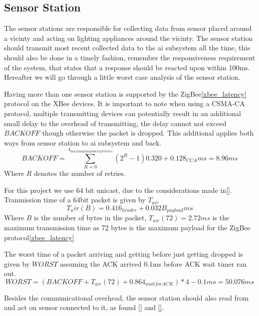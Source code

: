 \subsection{Sensor Station}\label{sub:sensorStation}

The sensor stations are responsible for collecting data from sensor placed around a vicinty and acting on lighting appliances around the vicinty. The sensor station should transmit most recent collected data to the ai subsystem all the time, this should also be done in a timely fashion, remember the responsiveness requirement of the system, that states that a response should be reacted upon within 100ms. Hereafter we will go through a little worst case analysis of the sensor station.

Having more than one sensor station is supported by the ZigBee\cref{xbee_latency} protocol on the XBee devices. It is important to note when using a CSMA-CA protocol, multiple transmitting devices can potentially result in an additional small delay to the overhead of transmitting, the delay cannot not exceed $BACKOFF$ though otherwise the packet is dropped. This additional applies both ways from sensor station to ai subsystem and back.
\begin{equation*}
BACKOFF = \sum\limits_{R=0}^{4_{maximum number of retries}}(2^{R} - 1) 0.320 + 0.128_{CCA} ms = 8.96 ms
\end{equation*}
Where $R$ denotes the number of retries.

For this project we use 64 bit unicast, due to the considerations made in\cref{}.
Tranmission time of a 64bit packet is given by $T_{air}$
\begin{equation*}
T_air(B) = 0.416_{header} + 0.032B_{payload} ms
\end{equation*}
Where $B$ is the number of bytes in the packet, $T_{air}(72) = 2.72 ms$ is the maximum transmission time as 72 bytes is the maximum payload for the ZigBee protocol\cref{xbee_latency}

The worst time of a packet arriving and getting before just getting dropped is given by $WORST$ assuming the ACK arrived 0.1ms before ACK wait timer ran out.
\begin{equation*}
WORST = (BACKOFF + T_{air}(72) + 0.864_{wait for ACK})*4 - 0.1 ms = 50.076 ms
\end{equation*}

Besides the communicational overhead, the sensor station should also read from and act on sensor connected to it,  as found \cref{} and \cref{}.

